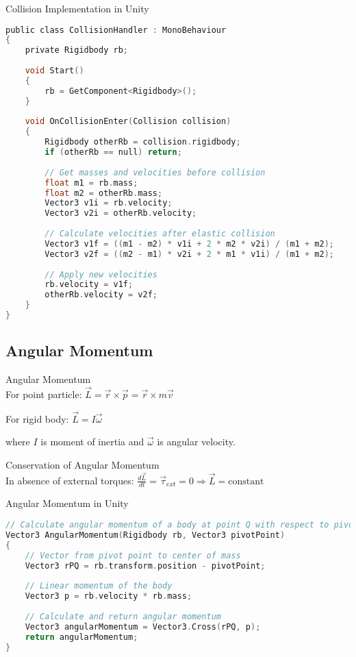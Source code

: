 \begin{code}{Collision Implementation in Unity}\\
\begin{lstlisting}[language=C, style=basesmol]
public class CollisionHandler : MonoBehaviour 
{
    private Rigidbody rb;
    
    void Start() 
    {
        rb = GetComponent<Rigidbody>();
    }
    
    void OnCollisionEnter(Collision collision) 
    {
        Rigidbody otherRb = collision.rigidbody;
        if (otherRb == null) return;
        
        // Get masses and velocities before collision
        float m1 = rb.mass;
        float m2 = otherRb.mass;
        Vector3 v1i = rb.velocity;
        Vector3 v2i = otherRb.velocity;
        
        // Calculate velocities after elastic collision
        Vector3 v1f = ((m1 - m2) * v1i + 2 * m2 * v2i) / (m1 + m2);
        Vector3 v2f = ((m2 - m1) * v2i + 2 * m1 * v1i) / (m1 + m2);
        
        // Apply new velocities
        rb.velocity = v1f;
        otherRb.velocity = v2f;
    }
}
\end{lstlisting}
\end{code}

\subsection{Angular Momentum}

\begin{definition}{Angular Momentum}\\
    For point particle:
    $\vec{L} = \vec{r} \times \vec{p} = \vec{r} \times m\vec{v}$
    
    For rigid body:
    $\vec{L} = I\vec{\omega}$
    
    where $I$ is moment of inertia and $\vec{\omega}$ is angular velocity.
\end{definition}

\begin{concept}{Conservation of Angular Momentum}\\
    In absence of external torques:
    $\frac{d\vec{L}}{dt} = \vec{\tau}_{ext} = 0 \Rightarrow \vec{L} = \text{constant}$
\end{concept}

\begin{code}{Angular Momentum in Unity}\\
\begin{lstlisting}[language=C, style=basesmol]
// Calculate angular momentum of a body at point Q with respect to pivot P
Vector3 AngularMomentum(Rigidbody rb, Vector3 pivotPoint) 
{
    // Vector from pivot point to center of mass
    Vector3 rPQ = rb.transform.position - pivotPoint;
    
    // Linear momentum of the body
    Vector3 p = rb.velocity * rb.mass;
    
    // Calculate and return angular momentum
    Vector3 angularMomentum = Vector3.Cross(rPQ, p);
    return angularMomentum;
}
\end{lstlisting}
\end{code}

